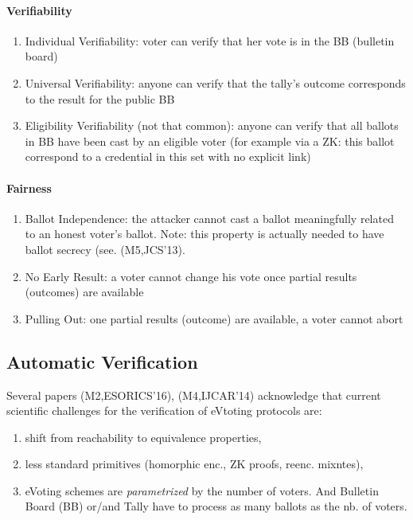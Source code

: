 \paragraph*{Verifiability}
\begin{enumerate}
\item Individual Verifiability: voter can verify that her vote is in the BB (bulletin board)
\item Universal Verifiability: anyone can verify that the tally's outcome corresponds to the result for the public BB
\item Eligibility Verifiability (not that common): anyone can verify that all ballots in BB have been cast by an eligible voter
  (for example via a ZK: this ballot correspond to a credential in this set with no explicit link)
\end{enumerate}

\paragraph*{Fairness}
\begin{enumerate}
\item Ballot Independence: the attacker cannot cast a ballot meaningfully related to an honest voter's ballot.
  Note: this property is actually needed to have ballot secrecy (see. (M5,JCS'13).
\item No Early Result: a voter cannot change his vote once partial results (outcomes) are available
\item Pulling Out: one partial results (outcome) are available, a voter cannot abort
\end{enumerate}


\subsection{Automatic Verification}

Several papers (M2,ESORICS'16), (M4,IJCAR'14) acknowledge that current scientific challenges for the verification
of eVtoting protocols are:
 \begin{enumerate}
 \item shift from reachability to equivalence properties,
 \item less standard primitives (\eg homorphic enc., ZK proofs, reenc. mixntes),
 \item eVoting schemes are {\em parametrized} by the number of voters. And Bulletin Board (BB) or\slash and Tally have to process
   as many ballots as the nb. of voters.
 \end{enumerate}

